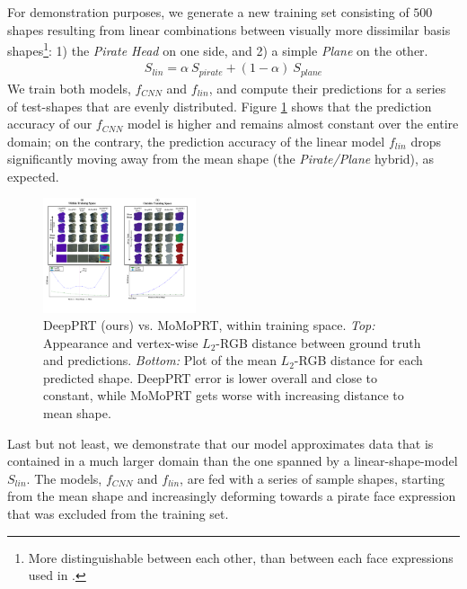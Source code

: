For demonstration purposes, we generate a new training set consisting of $500$ shapes resulting from linear combinations between visually more dissimilar basis shapes\footnote{More distinguishable between each other, than between each face expressions used in \cite{MoMo}.}: 1) the \textit{Pirate Head } on one side, and 2)  a simple \textit{Plane} on the other. 
\begin{align*}
S_{lin} = \alpha ~ S_{pirate} + (1 - \alpha)~S_{plane}
\end{align*}
We train both models, $f_{CNN}$ and $f_{lin}$, and compute their predictions for a series of test-shapes that are evenly distributed. Figure \ref{Fig:DPRT vs MoMoPRT A} shows that the prediction accuracy of our $f_{CNN}$ model is higher and remains almost constant over the entire domain; on the contrary, the prediction accuracy of the linear model $f_{lin}$ drops significantly moving away from the mean shape (the \textit{Pirate/Plane} hybrid), as expected. 
\begin{figure}[h]
  \centering
    \includegraphics[width=0.4\textwidth]{Figures/DPRT_vs_MoMoPRT_a.pdf}
     \caption{DeepPRT (ours) vs. MoMoPRT, within training space.\textit{ Top:} Appearance and vertex-wise $L_2$-RGB distance between ground truth and predictions.\textit{ Bottom:} Plot of the mean $L_2$-RGB distance for each predicted shape. DeepPRT error is lower overall and close to constant, while MoMoPRT gets worse with increasing distance to mean shape.}
     \label{Fig:DPRT vs MoMoPRT A}
\end{figure}

Last but not least, we demonstrate that our model approximates data that is contained in a much larger domain than the one spanned by a linear-shape-model $S_{lin}$. The models, $f_{CNN}$ and $f_{lin}$, are fed with a series of sample shapes, starting from the mean shape and increasingly deforming towards a pirate face expression that was excluded from the training set. 

